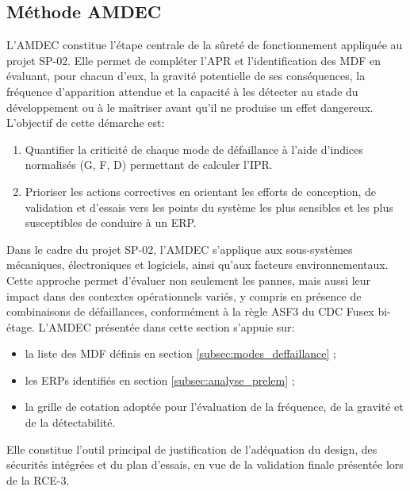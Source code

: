 \subsection{Méthode \acrshort{AMDEC}}
\label{subsec:amdec}

L’\acrfull{AMDEC} constitue l’étape centrale de la sûreté de fonctionnement appliquée au projet SP-02. Elle permet de compléter
l’\acrlong{APR} et l’identification des \acrlong{MDF} en évaluant, pour chacun d’eux, la gravité potentielle de ses
conséquences, la fréquence d’apparition attendue et la capacité à les détecter au stade du développement ou à le maîtriser
avant qu’il ne produise un effet dangereux. L’objectif de cette démarche est:
\begin{enumerate}
    \item Quantifier la criticité de chaque mode de défaillance à l’aide d’indices normalisés (G, F, D) permettant de calculer
    l’\acrfull{IPR}.
    \item Prioriser les actions correctives en orientant les efforts de conception, de validation et d’essais vers les points du
    système les plus sensibles et les plus susceptibles de conduire à un \acrlong{ERP}.\\
\end{enumerate}

Dans le cadre du projet SP-02, l’\acrshort{AMDEC} s’applique aux sous-systèmes mécaniques, électroniques et logiciels, ainsi qu’aux
facteurs environnementaux. Cette approche permet d’évaluer non seulement les pannes, mais aussi leur impact dans des contextes
opérationnels variés, y compris en présence de combinaisons de défaillances, conformément à la règle ASF3 du \acrshort{CDC}
\gls{Fusex} bi-étage. L’\acrshort{AMDEC} présentée dans cette section s’appuie sur:
\begin{itemize}
    \item la liste des \acrfull{MDF} définis en section \ref{subsec:modes_deffaillance} ;
    \item les \acrfull{ERPs} identifiés en section \ref{subsec:analyse_prelem} ;
    \item la grille de cotation adoptée pour l’évaluation de la fréquence, de la gravité et de la détectabilité.\\
\end{itemize}

Elle constitue l’outil principal de justification de l’adéquation du design, des sécurités intégrées et du plan d’essais, en vue de
la validation finale présentée lors de la \acrshort{RCE}-3.\\

